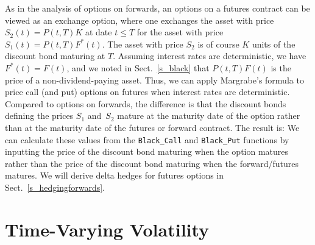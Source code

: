 As in the analysis of options on forwards, an options on a futures contract can be viewed as an exchange option, where one exchanges the asset with price
$S_2(t) = P(t,T)K$ at date $t\leq T$ for the asset with price $S_1(t) = P(t,T)F^*(t)$.  The asset with price $S_2$ is of course $K$ units of the discount bond maturing at $T$.  Assuming interest rates are deterministic, we have $F^*(t) = F(t)$, and we noted in Sect.~\ref{s_black} that $P(t,T)F(t)$ is the price of a non-dividend-paying asset.  Thus, we can apply Margrabe's formula to price call (and put) options on futures when interest rates are deterministic.  Compared to options on forwards, the difference is that the discount bonds defining the prices $S_1$ and~$S_2$ mature at the maturity date of the option rather than at the maturity date of the futures or forward contract.  The result is:
We can calculate these values from the \verb!Black_Call! and \verb!Black_Put! functions by inputting the price of the discount bond maturing when the option matures rather than the price of the discount bond maturing when the forward/futures matures.  
We will derive delta hedges for futures options in  Sect.~\ref{s_hedgingforwards}.






\section{Time-Varying Volatility}\label{s_volatility}

